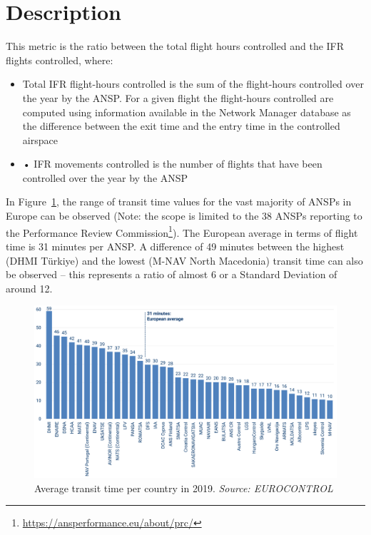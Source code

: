 \documentclass[
  11pt,
  a4paper,
]{book}
\DeclareRobustCommand{\href}[2]{#2\footnote{\url{#1}}}
\begin{document}
\hypertarget{description}{%
\section{Description}\label{description}}

This metric is the ratio between the total flight hours controlled and
the IFR flights controlled, where:

\begin{itemize}
\item
  Total IFR flight-hours controlled is the sum of the flight-hours
  controlled over the year by the ANSP. For a given flight the
  flight-hours controlled are computed using information available in
  the Network Manager database as the difference between the exit time
  and the entry time in the controlled airspace
\item
  • IFR movements controlled is the number of flights that have been
  controlled over the year by the ANSP
\end{itemize}

In Figure~\ref{fig-transit-time}, the range of transit time values for
the vast majority of ANSPs in Europe can be observed (Note: the scope is
limited to the 38 ANSPs reporting to the
\href{https://ansperformance.eu/about/prc/}{Performance Review
Commission}). The European average in terms of flight time is 31 minutes
per ANSP. A difference of 49 minutes between the highest (DHMI Türkiye)
and the lowest (M-NAV North Macedonia) transit time can also be observed
-- this represents a ratio of almost 6 or a Standard Deviation of around
12.

\begin{figure}

{\centering \includegraphics{chapters/../figures/transit_time.svg}

}

\caption{\label{fig-transit-time}Average transit time per country in
2019. \emph{Source: EUROCONTROL}}

\end{figure}
\end{document}
